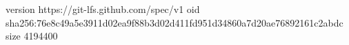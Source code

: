 version https://git-lfs.github.com/spec/v1
oid sha256:76e8c49a5e3911d02ea9f88b3d02d411fd951d34860a7d20ae76892161c2abdc
size 4194400
